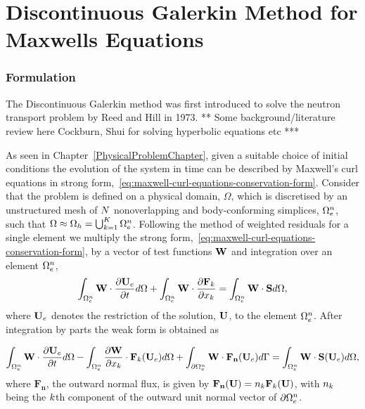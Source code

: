 \chapter{Discontinuous Galerkin Method for Maxwells Equations} %
\label{Chapter3}

\subsection{Formulation}

The Discontinuous Galerkin method was first introduced to solve the neutron transport problem by Reed and Hill \cite{} in 1973.
** Some background/literature review here Cockburn, Shui for solving hyperbolic equations etc ***

As seen in Chapter~\ref{PhysicalProblemChapter}, given a suitable choice of initial conditions the evolution of the system in time can be described by Maxwell's curl equations in strong form,~\eqref{eq:maxwell-curl-equations-conservation-form}. Consider that the problem is defined on a physical domain, $\Omega$, which is discretised by an unstructured mesh of $\elemtot$ nonoverlapping and body-conforming simplices, $\Omega_e^{n}$, such that $ \Omega \approx \Omega_h = \mathop{\bigcup}_{k=1}^{K} \Omega_e^{n} $.
Following the method of weighted residuals for a single element we multiply the strong form,~\eqref{eq:maxwell-curl-equations-conservation-form}, by a vector of test functions $\mathbf{W}$ and integration over an element $\Omega_e^{n}$,
$$
\int_{\Omega_e^{n}} \mathbf{W} \cdot \frac{\partial \mathbf{U}_e}{\partial t} d\Omega  + \int_{\Omega_e^{n}} \mathbf{W} \cdot \frac{\partial \mathbf{F}_{k}}{\partial x_{k}}= \int_{\Omega_e^{n}} \mathbf{W} \cdot \mathbf{S} d\Omega,
$$
where $\mathbf{U}_e$ denotes the restriction of the solution, $\mathbf{U}$, to the element $\Omega_e^{n}$. After integration by parts the weak form is obtained as

\begin{equation}
\int_{\Omega_e^{n}} \mathbf{W} \cdot \frac{\partial \mathbf{U}_e}{\partial t} d\Omega  - \int_{\Omega_e^{n}} \frac{\partial \mathbf{W}}{\partial x_{k}} \cdot
\mathbf{F}_{k}(\mathbf{U}_e) d\Omega + \int_{\partial \Omega_e^{n}} \mathbf{W} \cdot \mathbf{\mathbf{F}_n}(\mathbf{U}_e) d\Gamma
= \int_{\Omega_e^{n}} \mathbf{W} \cdot \mathbf{S}(\mathbf{U}_e) d\Omega,
\label{eq:weak-form-with-physical-flux}
\end{equation}
where $\mathbf{F_n}$, the outward normal flux, is given by $ \mathbf{F_n}(\mathbf{U}) = n_{k} \mathbf{F}_k(\mathbf{U}) $, with $n_{k}$ being the $k$th component of the outward unit normal vector of $\partial \Omega_e^{n}$.

